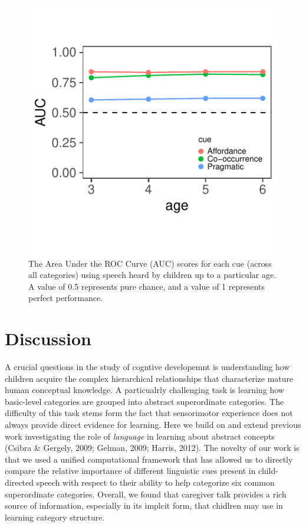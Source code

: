 \documentclass[english,,man,floatsintext]{apa6}
\begin{document}
\begin{figure}[h]

{\centering \includegraphics{cogsci_journal_files/figure-latex/dev-1} 

}

\caption{\label{fig:dev} The Area Under the ROC Curve (AUC) scores for each cue (across all categories) using speech heard by children up to a particular age. A value of 0.5 represents pure chance, and a value of 1 represents perfect performance.}\label{fig:dev}
\end{figure}

\hypertarget{discussion}{%
\section{Discussion}\label{discussion}}

A crucial questions in the study of cogntive developemnt is understanding how children acquire the complex hierarchical relationships that characterize mature human conceptual knowledge. A particualrly challenging task is learning how basic-level categories are grouped into abstract superordinate categories. The difficulty of this task stems form the fact that sensorimotor experience does not always provide direct evidence for learning. Here we build on and extend previous work investigating the role of \emph{language} in learning about abstract concepts (Csibra \& Gergely, 2009; Gelman, 2009; Harris, 2012). The novelty of our work is that we used a unified computational framework that has allowed us to directly compare the relative importance of different linguistic cues present in child-directed speech with respect to their ability to help categorize six common superordinate categories. Overall, we found that caregiver talk provides a rich source of information, especially in its implcit form, that chidlren may use in learning category structure.
\end{document}
